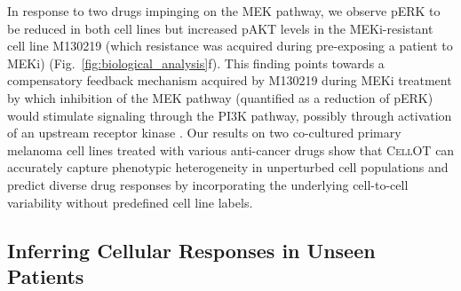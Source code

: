  In response to two drugs impinging on the MEK pathway, we observe pERK to be reduced in both cell lines but increased pAKT levels in the MEKi-resistant cell line M130219 (which resistance was acquired during pre-exposing a patient to MEKi) (Fig.~\ref{fig:biological_analysis}f). This finding points towards a compensatory feedback mechanism acquired by M130219 during MEKi treatment by which inhibition of the MEK pathway (quantified as a reduction of pERK) would stimulate signaling through the PI3K pathway, possibly through activation of an upstream receptor kinase \citep{caunt2015mek1}. 
Our results on two co-cultured primary melanoma cell lines treated with various anti-cancer drugs show that \textsc{CellOT} can accurately capture phenotypic heterogeneity in unperturbed cell populations and predict diverse drug responses by incorporating the underlying cell-to-cell variability without predefined cell line labels. 


\subsection{Inferring Cellular Responses in Unseen Patients}

